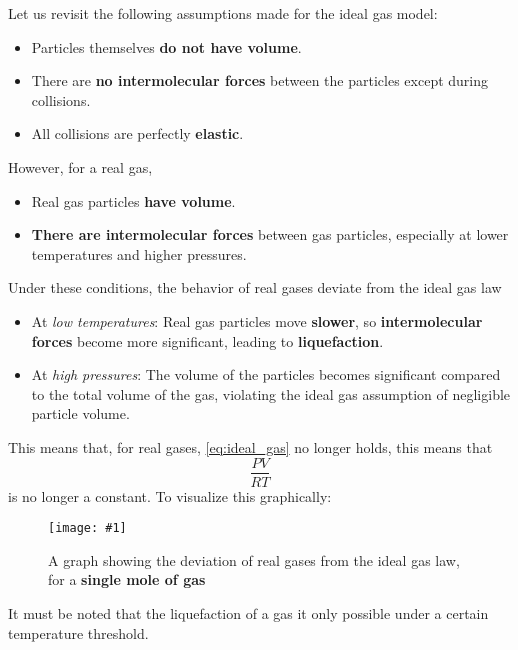 \documentclass[a4paper,12pt]{article}
\newcommand{\img}[4]{\begin{center}
  \begin{figure}[H]
    \centering
    \texttt{[image: \#1]}
    \caption{#3}
    \label{fig:#4}
  \end{figure}
\end{center}}
\begin{document}
Let us revisit the following assumptions made for the ideal gas model:
\begin{itemize}
  \item Particles themselves \textbf{do not have volume}.
  \item There are \textbf{no intermolecular forces} between the particles except during collisions.
  \item All collisions are perfectly \textbf{elastic}.
\end{itemize}

However, for a real gas,
\begin{itemize}
  \item Real gas particles \textbf{have volume}.
  \item \textbf{There are intermolecular forces} between gas particles, especially at lower temperatures and higher pressures.
\end{itemize}
Under these conditions, the behavior of real gases deviate from the ideal gas law
\begin{itemize}
  \item At \textit{low temperatures}: Real gas particles move \textbf{slower}, so \textbf{intermolecular forces} become more significant, leading to \textbf{liquefaction}.
  \item At \textit{high pressures}: The volume of the particles becomes significant compared to the total volume of the gas, violating the ideal gas assumption of negligible particle volume.
\end{itemize}

This means that, for real gases, \cref{eq:ideal_gas} no longer holds, this means that $$\frac{PV}{RT}$$ is no longer a constant. To visualize this graphically:
\img{realgasgraph.png}{0.5}{A graph showing the deviation of real gases from the ideal gas law, for a \textbf{single mole of gas}}{real_gas}

It must be noted that the liquefaction of a gas it only possible under a certain temperature threshold.
\end{document}
